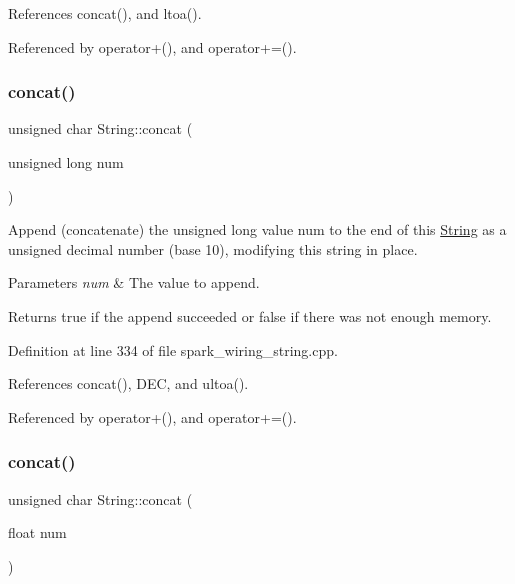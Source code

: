 References concat(), and ltoa().



Referenced by operator+(), and operator+=().

\mbox{\label{class_string_ad502777b7549182fe9b1a14879acf307}} 
\subsubsection{\texorpdfstring{concat()}{concat()}\hspace{0.1cm}{\footnotesize\ttfamily [9/12]}}
{\footnotesize\ttfamily unsigned char String\+::concat (\begin{DoxyParamCaption}\item[{unsigned long}]{num }\end{DoxyParamCaption})}



Append (concatenate) the unsigned long value num to the end of this \hyperlink{class_string}{String} as a unsigned decimal number (base 10), modifying this string in place. 


\begin{DoxyParams}{Parameters}
{\em num} & The value to append.\\
\hline
\end{DoxyParams}
\begin{DoxyReturn}{Returns}
true if the append succeeded or false if there was not enough memory. 
\end{DoxyReturn}


Definition at line 334 of file spark\+\_\+wiring\+\_\+string.\+cpp.



References concat(), D\+EC, and ultoa().



Referenced by operator+(), and operator+=().

\mbox{\label{class_string_af6029b556adb9a23d82d1f276ce4f8ee}} 
\subsubsection{\texorpdfstring{concat()}{concat()}\hspace{0.1cm}{\footnotesize\ttfamily [10/12]}}
{\footnotesize\ttfamily unsigned char String\+::concat (\begin{DoxyParamCaption}\item[{float}]{num }\end{DoxyParamCaption})}




